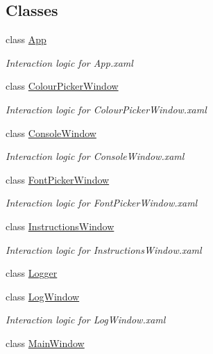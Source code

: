 \subsection*{Classes}
\begin{DoxyCompactItemize}
\item 
class \hyperlink{class_c_p_u___o_s___simulator_1_1_app}{App}
\begin{DoxyCompactList}\small\item\em Interaction logic for App.\+xaml \end{DoxyCompactList}\item 
class \hyperlink{class_c_p_u___o_s___simulator_1_1_colour_picker_window}{Colour\+Picker\+Window}
\begin{DoxyCompactList}\small\item\em Interaction logic for Colour\+Picker\+Window.\+xaml \end{DoxyCompactList}\item 
class \hyperlink{class_c_p_u___o_s___simulator_1_1_console_window}{Console\+Window}
\begin{DoxyCompactList}\small\item\em Interaction logic for Console\+Window.\+xaml \end{DoxyCompactList}\item 
class \hyperlink{class_c_p_u___o_s___simulator_1_1_font_picker_window}{Font\+Picker\+Window}
\begin{DoxyCompactList}\small\item\em Interaction logic for Font\+Picker\+Window.\+xaml \end{DoxyCompactList}\item 
class \hyperlink{class_c_p_u___o_s___simulator_1_1_instructions_window}{Instructions\+Window}
\begin{DoxyCompactList}\small\item\em Interaction logic for Instructions\+Window.\+xaml \end{DoxyCompactList}\item 
class \hyperlink{class_c_p_u___o_s___simulator_1_1_logger}{Logger}
\item 
class \hyperlink{class_c_p_u___o_s___simulator_1_1_log_window}{Log\+Window}
\begin{DoxyCompactList}\small\item\em Interaction logic for Log\+Window.\+xaml \end{DoxyCompactList}\item 
class \hyperlink{class_c_p_u___o_s___simulator_1_1_main_window}{Main\+Window}

\end{DoxyCompactItemize}
